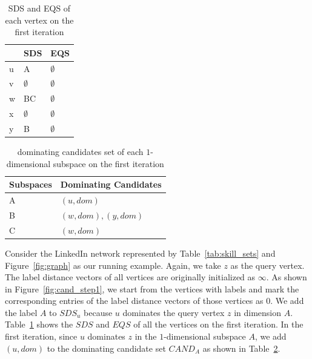 \begin{table}[H]
    \centering
    \begin{tabular}{|l|l|l|}
    \hline
      & SDS         & EQS         \\ \hline
    u & A           & $\emptyset$ \\ \hline
    v & $\emptyset$ & $\emptyset$ \\ \hline
    w & BC          & $\emptyset$ \\ \hline
    x & $\emptyset$ & $\emptyset$ \\ \hline
    y & B           & $\emptyset$ \\ \hline
    \end{tabular}
    \caption{\label{tab:sds_step1}SDS and EQS of each vertex on the first iteration}
    
\end{table}

\begin{table}[H]
    \centering

    \begin{tabular}{|l|l|}
    \hline
    Subspaces & Dominating Candidates \\ \hline
    A         & $(u, dom)$            \\ \hline
    B         & $(w, dom), (y, dom)$            \\ \hline
    C         & $(w, dom)$            \\ \hline
    \end{tabular}
    \caption{\label{tab:cand_set_step1}dominating candidates set of each $1$-dimensional subspace on the first iteration}
    
\end{table}

Consider the LinkedIn network represented by Table~\ref{tab:skill_sets} and Figure~\ref{fig:graph} as our running example. Again, we take $z$ as the query vertex. The label distance vectors of all vertices are originally initialized as $\infty$. As shown in Figure~\ref{fig:cand_step1}, we start from the vertices with labels and mark the corresponding entries of the label distance vectors of those vertices as $0$. 
We add the label $A$ to $\mathit{SDS}_u$ because $u$ dominates the query vertex $z$ in dimension $A$. Table~\ref{tab:sds_step1} shows the $\mathit{SDS}$ and $\mathit{EQS}$ of all the vertices on the first iteration.
In the first iteration, since $u$ dominates $z$ in the $1$-dimensional subspace $A$, we add $(u, dom)$ to the dominating candidate set $\mathit{CAND}_A$ as shown in Table~\ref{tab:cand_set_step1}.

